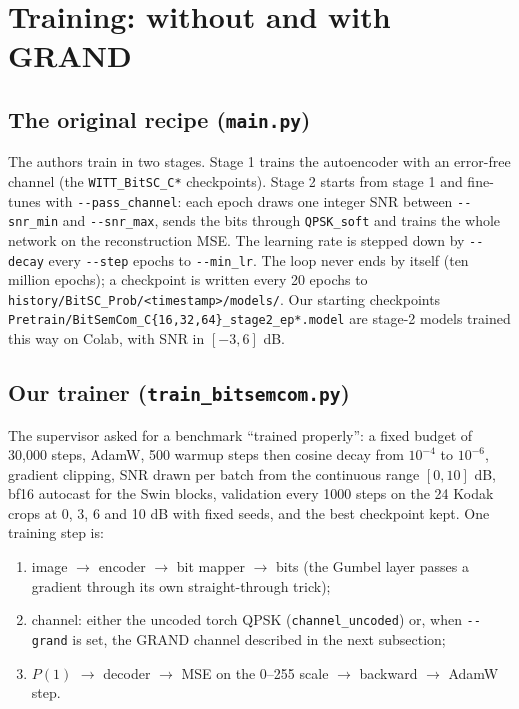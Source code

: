 \documentclass{article}
\begin{document}
\section{Training: without and with GRAND}
\label{sec:training}

\subsection{The original recipe (\texttt{main.py})}

The authors train in two stages. Stage 1 trains the autoencoder with an error-free channel (the
\texttt{WITT\_BitSC\_C*} checkpoints). Stage 2 starts from stage 1 and fine-tunes with
\texttt{-{}-pass\_channel}: each epoch draws one integer SNR between \texttt{-{}-snr\_min} and
\texttt{-{}-snr\_max}, sends the bits through \texttt{QPSK\_soft} and trains the whole network on the
reconstruction MSE. The learning rate is stepped down by \texttt{-{}-decay} every \texttt{-{}-step} epochs
to \texttt{-{}-min\_lr}. The loop never ends by itself (ten million epochs); a checkpoint is written every
20 epochs to \texttt{history/BitSC\_Prob/<timestamp>/models/}. Our starting checkpoints
\texttt{Pretrain/BitSemCom\_C\{16,32,64\}\_stage2\_ep*.model} are stage-2 models trained this way on Colab,
with SNR in $[-3, 6]$ dB.

\subsection{Our trainer (\texttt{train\_bitsemcom.py})}

The supervisor asked for a benchmark ``trained properly'': a fixed budget of 30{,}000 steps, AdamW,
500 warmup steps then cosine decay from $10^{-4}$ to $10^{-6}$, gradient clipping, SNR drawn per batch
from the continuous range $[0, 10]$ dB, bf16 autocast for the Swin blocks, validation every 1000 steps
on the 24 Kodak crops at 0, 3, 6 and 10 dB with fixed seeds, and the best checkpoint kept. One training
step is:

\begin{enumerate}
\item image $\to$ encoder $\to$ bit mapper $\to$ bits (the Gumbel layer passes a gradient through its own
straight-through trick);
\item channel: either the uncoded torch QPSK (\texttt{channel\_uncoded}) or, when \texttt{-{}-grand}
is set, the GRAND channel described in the next subsection;
\item $P(1)$ $\to$ decoder $\to$ MSE on the 0--255 scale $\to$ backward $\to$ AdamW step.
\end{enumerate}
\end{document}
